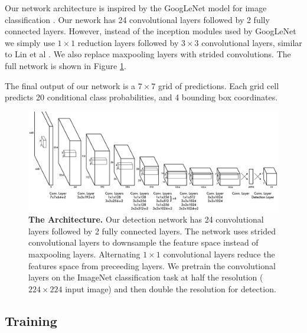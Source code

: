 \documentclass{article} %
\begin{document}
Our network architecture is inspired by the GoogLeNet model for image classification \cite{DBLP:journals/corr/SzegedyLJSRAEVR14}. Our nework has 24 convolutional layers followed by 2 fully connected layers. However, instead of the inception modules used by GoogLeNet we simply use $1 \times 1$ reduction layers followed by $3 \times 3$ convolutional layers, similar to Lin et al \cite{DBLP:journals/corr/LinCY13}. We also replace maxpooling layers with strided convolutions. The full network is shown in Figure \ref{net}.

The final output of our network is a $7 \times 7$ grid of predictions. Each grid cell predicts 20 conditional class probabilities, and 4 bounding box coordinates.

   \begin{figure}[h]
      \centering
        \includegraphics[width=\linewidth]{detectnet2}
      \caption{\textbf{The Architecture.} Our detection network has 24 convolutional layers followed by 2 fully connected layers. The network uses strided convolutional layers to downsample the feature space instead of maxpooling layers. Alternating $1 \times 1$ convolutional layers reduce the features space from preceeding layers. We pretrain the convolutional layers on the ImageNet classification task at half the resolution ($224 \times 224$ input image) and then double the resolution for detection.}
      \label{net}
   \end{figure}

\subsection{Training}
%
\end{document}
